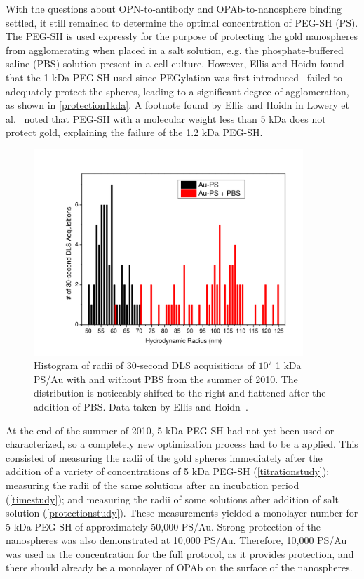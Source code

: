 With the questions about OPN-to-antibody and OPAb-to-nanosphere binding settled, it still remained to determine the optimal concentration of PEG-SH (PS). The PEG-SH is used expressly for the purpose of protecting the gold nanospheres from agglomerating when placed in a salt solution, e.g. the phosphate-buffered saline (PBS) solution present in a cell culture. However, Ellis and Hoidn found that the 1 kDa PEG-SH used since PEGylation was first introduced~\citep{warren} failed to adequately protect the spheres, leading to a significant degree of agglomeration, as shown in \autoref{protection1kda}. A footnote found by Ellis and Hoidn in Lowery et al.~\citep{westpegylation} noted that PEG-SH with a molecular weight less than 5 kDa does not protect gold, explaining the failure of the 1.2 kDa PEG-SH.

\begin{figure}[htbp]
\centering
\includegraphics[keepaspectratio,width=4in,height=0.75\textheight]{10^7.pdf}
\caption{Histogram of radii of 30-second DLS acquisitions of $10^7$ 1 kDa PS/Au with and without PBS from the summer of 2010. The distribution is noticeably shifted to the right and flattened after the addition of PBS. Data taken by Ellis and Hoidn~\citep{hoidnellis}.}
\label{protection1kda}
\end{figure}



At the end of the summer of 2010, 5 kDa PEG-SH had not yet been used or characterized, so a completely new optimization process had to be a applied. This consisted of measuring the radii of the gold spheres immediately after the addition of a variety of concentrations of 5 kDa PEG-SH (\autoref{titrationstudy}); measuring the radii of the same solutions after an incubation period (\autoref{timestudy}); and measuring the radii of some solutions after addition of salt solution (\autoref{protectionstudy}). These measurements yielded a monolayer number for 5 kDa PEG-SH of approximately 50,000 PS\slash Au. Strong protection of the nanospheres was also demonstrated at 10,000 PS\slash Au. Therefore, 10,000 PS\slash Au was used as the concentration for the full protocol, as it provides protection, and there should already be a monolayer of OPAb on the surface of the nanospheres.

